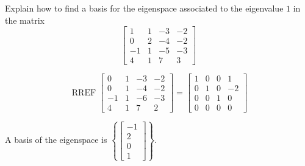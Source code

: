 
\begin{exerciseStatement}


Explain how to find a basis for the eigenspace associated to the eigenvalue \( 1 \) in the matrix \[ \left[\begin{array}{cccc}
1 & 1 & -3 & -2 \\
0 & 2 & -4 & -2 \\
-1 & 1 & -5 & -3 \\
4 & 1 & 7 & 3
\end{array}\right] \]


\end{exerciseStatement}
    
\begin{exerciseAnswer} 


\[\operatorname{RREF} \left[\begin{array}{cccc}
0 & 1 & -3 & -2 \\
0 & 1 & -4 & -2 \\
-1 & 1 & -6 & -3 \\
4 & 1 & 7 & 2
\end{array}\right] = \left[\begin{array}{cccc}
1 & 0 & 0 & 1 \\
0 & 1 & 0 & -2 \\
0 & 0 & 1 & 0 \\
0 & 0 & 0 & 0
\end{array}\right] \]



A basis of the eigenspace is \( \left\{ \left[\begin{array}{c}
-1 \\
2 \\
0 \\
1
\end{array}\right] \right\} \).


\end{exerciseAnswer}
    
